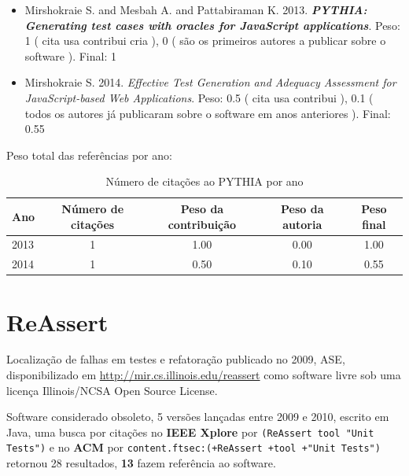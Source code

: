\begin{itemize}
\item Mirshokraie S. and Mesbah A. and Pattabiraman K.
      2013.
        \textbf{\textit{ PYTHIA: Generating test cases with oracles for JavaScript applications}}.
      Peso:
      1 (
          cita
          usa
          contribui
          cria
      ),
      0 (
são os primeiros autores a publicar sobre o software
      ).
      Final:
      1

\item Mirshokraie S.
      2014.
        \textit{ Effective Test Generation and Adequacy Assessment for JavaScript-based Web Applications}.
      Peso:
      0.5 (
          cita
          usa
          contribui
      ),
      0.1 (
todos os autores já publicaram sobre o software em anos anteriores
      ).
      Final:
      0.55

\end{itemize}

Peso total das referências por ano:

\begin{table}[h]
\caption{Número de citações ao PYTHIA por ano}
\centering
\begin{tabular}{| l | c | c | c | c |}
  \hline
  Ano & Número de citações & Peso da contribuição & Peso da autoria & Peso final \\
  \hline
  2013
    & 1
    & 1.00
    & 0.00
    & 1.00 \\
  2014
    & 1
    & 0.50
    & 0.10
    & 0.55 \\
  \hline
\end{tabular}
\end{table}


\section{ReAssert}

Localização de falhas em testes e refatoração
publicado no 2009, ASE,
disponibilizado em \url{http://mir.cs.illinois.edu/reassert}
como software livre
sob uma licença Illinois/NCSA Open Source License.

Software considerado obsoleto,
5 versões lançadas
entre 2009 e 2010,
escrito em Java,
uma busca por citações no {\bf IEEE Xplore} por
\texttt{(ReAssert tool "Unit Tests")}
e no {\bf ACM} por
\texttt{content.ftsec:(+ReAssert +tool +"Unit Tests")}
retornou
28 resultados,
{\bf 13} fazem referência ao software.

